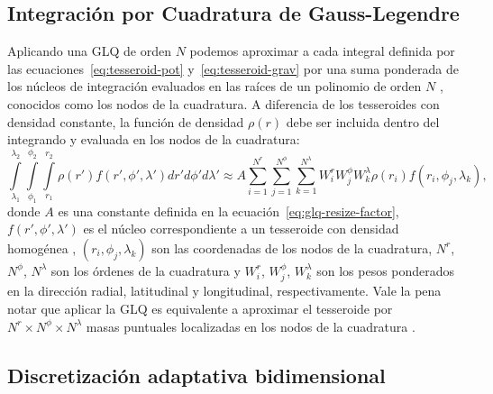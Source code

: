 \subsection{Integración por Cuadratura de Gauss-Legendre}

Aplicando una \ac{GLQ} de orden $N$ podemos aproximar a cada integral definida
por las ecuaciones~\ref{eq:tesseroid-pot} y~\ref{eq:tesseroid-grav} por una
suma ponderada de los núcleos de integración evaluados en las raíces de un
polinomio de orden $N$ \citep[p.~390]{hildebrand1987}, conocidos como los nodos
de la cuadratura.
A diferencia de los tesseroides con densidad constante, la función de densidad
$\rho(r)$ debe ser incluida dentro del integrando y evaluada en los nodos de la
cuadratura:
%
\begin{equation}
        \int\limits_{\lambda_1}^{\lambda_2}
        \int\limits_{\phi_1}^{\phi_2}
        \int\limits_{r_1}^{r_2}
        \rho(r') f(r', \phi', \lambda')
        dr' d\phi' d\lambda' \approx
        A
        \sum\limits_{i=1}^{N^r}
        \sum\limits_{j=1}^{N^\phi}
        \sum\limits_{k=1}^{N^\lambda}
        W_i^r W_j^\phi W_k^\lambda
        \rho(r_i) f(r_i, \phi_j, \lambda_k),
\label{eq:glq-var-dens}
\end{equation}
%
donde $A$ es una constante definida en la
ecuación~\ref{eq:glq-resize-factor}, $f(r', \phi', \lambda')$ es el núcleo
correspondiente a un tesseroide con densidad homogénea \citep{grombein2013},
$(r_i, \phi_j, \lambda_k)$ son las coordenadas de los nodos de la cuadratura,
$N^r$, $N^\phi$, $N^\lambda$ son los órdenes de la cuadratura y $W_i^r$,
$W_j^\phi$, $W_k^\lambda$ son los pesos ponderados en la dirección radial,
latitudinal y longitudinal, respectivamente.
Vale la pena notar que aplicar la \ac{GLQ} es equivalente a aproximar el
tesseroide por $N^r \times N^\phi \times N^\lambda$ masas puntuales localizadas
en los nodos de la cuadratura \citep{ku1977, asgharzadeh2007}.


\subsection{Discretización adaptativa bidimensional}

